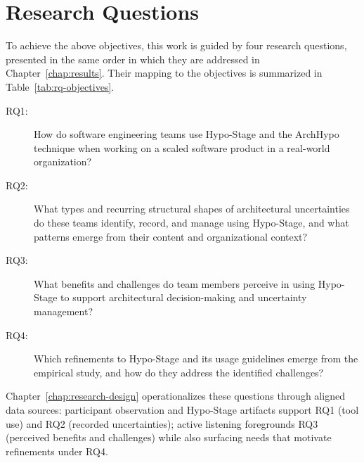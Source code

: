 \section{Research Questions}

To achieve the above objectives, this work is guided by four research questions, presented in the same order in which they are addressed in Chapter~\ref{chap:results}. Their mapping to the objectives is summarized in Table~\ref{tab:rq-objectives}.

\begin{description}
  \item[RQ1:] How do software engineering teams use Hypo-Stage and the ArchHypo technique when working on a scaled software product in a real-world organization?
  \item[RQ2:] What types and recurring structural shapes of architectural uncertainties do these teams identify, record, and manage using Hypo-Stage, and what patterns emerge from their content and organizational context?
  \item[RQ3:] What benefits and challenges do team members perceive in using Hypo-Stage to support architectural decision-making and uncertainty management?
  \item[RQ4:] Which refinements to Hypo-Stage and its usage guidelines emerge from the empirical study, and how do they address the identified challenges?
\end{description}

Chapter~\ref{chap:research-design} operationalizes these questions through aligned data sources: participant observation and Hypo-Stage artifacts support RQ1 (tool use) and RQ2 (recorded uncertainties); active listening foregrounds RQ3 (perceived benefits and challenges) while also surfacing needs that motivate refinements under RQ4.

